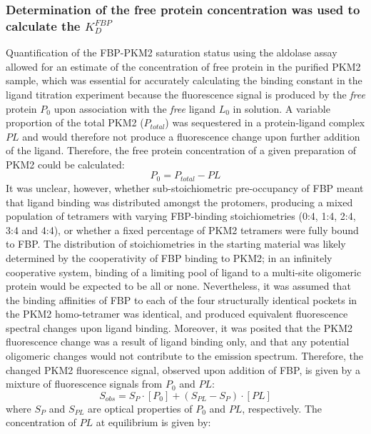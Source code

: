 \subsubsection{Determination of the free protein concentration was used to calculate the $K_{D}^{FBP}$}
Quantification of the FBP-PKM2 saturation status using the aldolase assay allowed for an estimate of the concentration of free protein in the purified PKM2 sample, which was essential for accurately calculating the binding constant in the ligand titration experiment because the fluorescence signal is produced by the \textit{free} protein $P_{0}$ upon association with the \textit{free} ligand $L_{0}$ in solution. A variable proportion of the total PKM2 ($P_{total}$) was sequestered in a protein-ligand complex $PL$ and would therefore not produce a fluorescence change upon further addition of the ligand. Therefore, the free protein concentration of a given preparation of PKM2 could be calculated:
%
%
\begin{equation}
P_{0} = P_{total} -  PL
\end{equation}
%
%
It was unclear, however, whether sub-stoichiometric pre-occupancy of FBP meant that ligand binding was distributed amongst the protomers, producing a mixed population of tetramers with varying FBP-binding stoichiometries (0:4, 1:4, 2:4, 3:4 and 4:4), or whether a fixed percentage of PKM2 tetramers were fully bound to FBP. The distribution of stoichiometries in the starting material was likely determined by the cooperativity of FBP binding to PKM2; in an infinitely cooperative system, binding of a limiting pool of ligand to a multi-site oligomeric protein would be expected to be all or none. Nevertheless, it was assumed that the binding affinities of FBP to each of the four structurally identical pockets in the PKM2 homo-tetramer was identical, and produced equivalent fluorescence spectral changes upon ligand binding. Moreover, it was posited that the PKM2 fluorescence change was a result of ligand binding only, and that any potential oligomeric changes would not contribute to the emission spectrum. Therefore, the changed PKM2 fluorescence signal, observed upon addition of FBP, is given by a mixture of fluorescence signals from $P_0$ and $PL$:
%
%
\begin{equation}
S_{obs} = S_P \cdot [P_0] + (S_{PL} - S_{P}) \cdot [PL]
\label{equ:fluorescence_signal}
\end{equation} 
%
%
where $S_{P}$ and $S_{PL}$ are optical properties of $P_0$ and $PL$, respectively. The concentration of $PL$ at equilibrium is given by:
